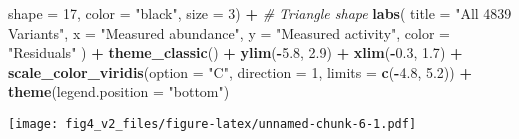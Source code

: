 \documentclass[
]{article}
\newenvironment{Shaded}{\begin{snugshade}}{\end{snugshade}}
\newcommand{\AttributeTok}[1]{\textcolor[rgb]{0.13,0.29,0.53}{#1}}
\newcommand{\CommentTok}[1]{\textcolor[rgb]{0.56,0.35,0.01}{\textit{#1}}}
\newcommand{\DecValTok}[1]{\textcolor[rgb]{0.00,0.00,0.81}{#1}}
\newcommand{\FloatTok}[1]{\textcolor[rgb]{0.00,0.00,0.81}{#1}}
\newcommand{\FunctionTok}[1]{\textcolor[rgb]{0.13,0.29,0.53}{\textbf{#1}}}
\newcommand{\NormalTok}[1]{#1}
\newcommand{\SpecialCharTok}[1]{\textcolor[rgb]{0.81,0.36,0.00}{\textbf{#1}}}
\newcommand{\StringTok}[1]{\textcolor[rgb]{0.31,0.60,0.02}{#1}}
\begin{document}
\begin{Shaded}
\begin{Highlighting}[]
             \AttributeTok{shape =} \DecValTok{17}\NormalTok{, }\AttributeTok{color =} \StringTok{"black"}\NormalTok{, }\AttributeTok{size =} \DecValTok{3}\NormalTok{) }\SpecialCharTok{+}  \CommentTok{\# Triangle shape}
  \FunctionTok{labs}\NormalTok{(}
    \AttributeTok{title =} \StringTok{"All 4839 Variants"}\NormalTok{,}
    \AttributeTok{x =} \StringTok{"Measured abundance"}\NormalTok{,}
    \AttributeTok{y =} \StringTok{"Measured activity"}\NormalTok{,}
    \AttributeTok{color =} \StringTok{"Residuals"}
\NormalTok{  ) }\SpecialCharTok{+}
  \FunctionTok{theme\_classic}\NormalTok{() }\SpecialCharTok{+}
  \FunctionTok{ylim}\NormalTok{(}\SpecialCharTok{{-}}\FloatTok{5.8}\NormalTok{, }\FloatTok{2.9}\NormalTok{) }\SpecialCharTok{+} \FunctionTok{xlim}\NormalTok{(}\SpecialCharTok{{-}}\FloatTok{0.3}\NormalTok{, }\FloatTok{1.7}\NormalTok{) }\SpecialCharTok{+}
  \FunctionTok{scale\_color\_viridis}\NormalTok{(}\AttributeTok{option =} \StringTok{"C"}\NormalTok{, }\AttributeTok{direction =} \DecValTok{1}\NormalTok{, }\AttributeTok{limits =} \FunctionTok{c}\NormalTok{(}\SpecialCharTok{{-}}\FloatTok{4.8}\NormalTok{, }\FloatTok{5.2}\NormalTok{)) }\SpecialCharTok{+}
  \FunctionTok{theme}\NormalTok{(}\AttributeTok{legend.position =} \StringTok{"bottom"}\NormalTok{)}
\end{Highlighting}
\end{Shaded}

\texttt{[image: fig4\_v2\_files/figure-latex/unnamed-chunk-6-1.pdf]}
\end{document}

